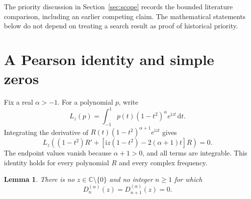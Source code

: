 \documentclass[11pt]{article}
\numberwithin{equation}{section}
\newtheorem{lemma}[theorem]{Lemma}
\theoremstyle{remark}
\newcommand{\ii}{\mathrm{i}}
\newcommand{\dd}{\,\mathrm{d}}
\newcommand{\C}{\mathbb{C}}
\begin{document}
The priority discussion in Section~\ref{sec:scope} records the bounded
literature comparison, including an earlier competing claim. The
mathematical statements below do not depend on treating a search result
as proof of historical priority.

\section{A Pearson identity and simple zeros}\label{sec:pearson}

Fix a real $\alpha>-1$. For a polynomial $p$, write
\[
 L_z(p)=\int_{-1}^1p(t)(1-t^2)^\alpha e^{\ii zt}\dd t.
\]
Integrating the derivative of
$R(t)(1-t^2)^{\alpha+1}e^{\ii zt}$ gives
\begin{equation}\label{eq:pearson}
 L_z\!\left((1-t^2)R'
       +[\ii z(1-t^2)-2(\alpha+1)t]R\right)=0.
\end{equation}
The endpoint values vanish because $\alpha+1>0$, and all terms are
integrable. This identity holds for every polynomial $R$ and every
complex frequency.

\begin{lemma}\label{lem:adjacent}
There is no $z\in\C\setminus\{0\}$ and no integer $n\ge1$ for which
\[
                 D_n^{(\alpha)}(z)=D_{n+1}^{(\alpha)}(z)=0.
\]
\end{lemma}
\end{document}

